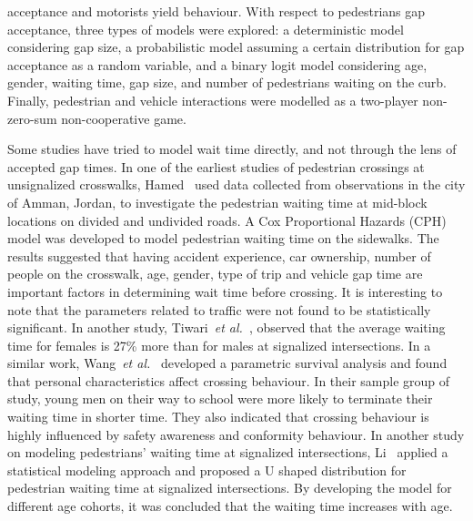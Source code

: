 acceptance and motorists yield behaviour. With respect to pedestrians gap acceptance, three types of models were explored: a deterministic model considering gap size, a probabilistic model assuming a certain distribution for gap acceptance as a random variable, and a binary logit model considering age, gender, waiting time, gap size, and number of pedestrians waiting on the curb. Finally, pedestrian and vehicle interactions were modelled as a two-player non-zero-sum non-cooperative game. 

Some studies have tried to model wait time directly, and not through the lens of accepted gap times. In one of the earliest studies of pedestrian crossings at unsignalized crosswalks, Hamed~\cite{hamed2001analysis} used data collected from observations in the city of Amman, Jordan, to investigate the pedestrian waiting time at mid-block locations on divided and undivided roads. A Cox Proportional Hazards (CPH) model was developed to model pedestrian waiting time on the sidewalks. The results suggested that having accident experience, car ownership, number of people on the crosswalk, age, gender, type of trip and vehicle gap time are important factors in determining wait time before crossing. It is interesting to note that the parameters related to traffic were not found to be statistically significant. In another study, Tiwari~\textit{et al.}~\cite{tiwari2007survival}, observed that the average waiting time for females is 27\% more than for males at signalized intersections. In a similar work, Wang~\textit{et al.}~\cite{wang2011individual} developed a parametric survival analysis and found that personal characteristics affect crossing behaviour. In their sample group of study, young men on their way to school were more likely to terminate their waiting time in shorter time. They also indicated that crossing behaviour is highly influenced by safety awareness and conformity behaviour. In another study on modeling pedestrians' waiting time at signalized intersections, Li~\cite{li2013model} applied a statistical modeling approach and proposed a U shaped distribution for pedestrian waiting time at signalized intersections. By developing the model for different age cohorts, it was concluded that the waiting time increases with age.

